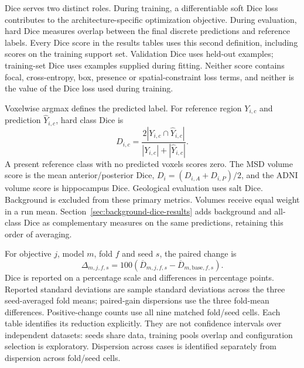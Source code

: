 \documentclass[12pt,a4paper]{article}
\begin{document}
Dice serves two distinct roles. During training, a differentiable soft
Dice loss contributes to the architecture-specific optimization
objective. During evaluation, hard Dice measures overlap between the
final discrete predictions and reference labels. Every Dice score in
the results tables uses this second definition, including scores on the
training support set. Validation Dice uses held-out examples;
training-set Dice uses examples supplied during fitting. Neither score
contains focal, cross-entropy, box, presence or spatial-constraint loss
terms, and neither is the value of the Dice loss used during training.

Voxelwise argmax defines the predicted label. For reference region
$Y_{i,c}$ and prediction $\widehat Y_{i,c}$, hard class Dice is
\begin{equation}
 D_{i,c}=\frac{2|Y_{i,c}\cap\widehat Y_{i,c}|}
 {|Y_{i,c}|+|\widehat Y_{i,c}|}.
\label{eq:reported-hard-dice}
\end{equation}
A present reference class with no predicted voxels scores zero.
The MSD volume score is the mean anterior/posterior Dice,
$D_i=(D_{i,A}+D_{i,P})/2$, and the ADNI volume score is hippocampus Dice. Geological evaluation
uses salt Dice.
Background is excluded from these primary metrics. Volumes receive
equal weight in a run mean. Section~\ref{sec:background-dice-results}
adds background and all-class Dice as complementary measures on
the same predictions, retaining this order of averaging.

For objective $j$, model $m$, fold $f$ and seed $s$, the paired change is
\begin{equation}
 \Delta_{m,j,f,s}=100\left(
 \overline D_{m,j,f,s}-\overline D_{m,\mathrm{base},f,s}\right).
\label{eq:paired-reported-gain}
\end{equation}
Dice is reported on a percentage scale and differences in percentage
points. Reported standard deviations are sample standard deviations across
the three seed-averaged fold means; paired-gain dispersions use the three
fold-mean differences. Positive-change counts use all nine matched
fold/seed cells. Each table identifies its reduction explicitly. They are not
confidence intervals over independent datasets: seeds share data,
training pools overlap and configuration selection is exploratory.
Dispersion across cases is identified separately from dispersion
across fold/seed cells.
\end{document}
